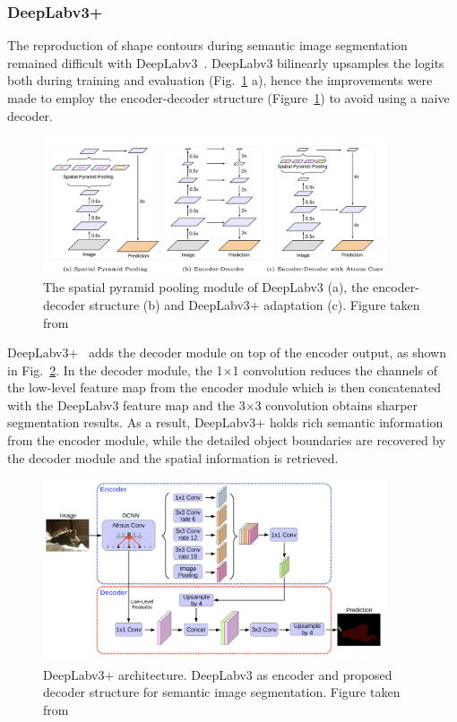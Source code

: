 \subsubsection{DeepLabv3+}
The reproduction of shape contours during semantic image segmentation remained difficult with DeepLabv3~\cite{chen2018encoder}.
DeepLabv3 bilinearly upsamples the logits both during training and evaluation (Fig.~\ref*{fig:deeplab} a), hence
the improvements were made to employ the encoder-decoder structure (Figure~\ref*{fig:deeplab}) to avoid using a naive decoder.
\begin{figure}[H] %
  \centering
  \includegraphics[width=0.9\textwidth]{figures/deeplab_encoderdecoder.png} %
  \caption{The spatial pyramid pooling module of DeepLabv3 (a), the encoder-decoder structure (b) and DeepLabv3+ adaptation (c). Figure taken from~\cite{chen2018encoder}} %
  \label{fig:deeplab} %
\end{figure} 
DeepLabv3+~\cite{chen2018encoder} adds the decoder module on top of the encoder output, as shown in Fig.~\ref*{fig:deeplabv3plus}.
In the decoder module, the 1$\times$1 convolution reduces the channels of the
low-level feature map from the encoder module which is then concatenated with the
DeepLabv3 feature map and the 3$\times$3 convolution obtains sharper segmentation results.
As a result, DeepLabv3+ holds rich semantic information from the encoder module,
while the detailed object boundaries are recovered by the decoder module and the spatial information is retrieved.
\begin{figure}[H] %
  \centering
  \includegraphics[width=0.9\textwidth]{figures/deeplabv3plus.png} %
  \caption{DeepLabv3+ architecture. DeepLabv3 as encoder and proposed decoder structure for semantic image segmentation. Figure taken from~\cite{chen2018encoder}} %
  \label{fig:deeplabv3plus} %
\end{figure} 

